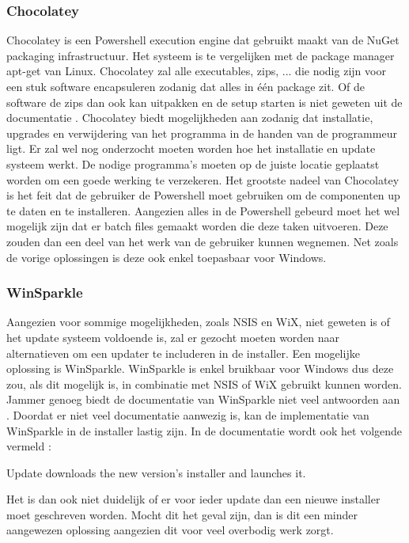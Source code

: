 \documentclass{article}
\begin{document}
\subsubsection{Chocolatey \citep{chocoMain}}
Chocolatey is een Powershell execution engine dat gebruikt maakt van de NuGet packaging infrastructuur.
Het systeem is te vergelijken met de package manager apt-get van Linux.
Chocolatey zal alle executables, zips, ... die nodig zijn voor een stuk software encapsuleren zodanig dat alles in \'e\'en package zit.
Of de software de zips dan ook kan uitpakken en de setup starten is niet geweten uit de documentatie \citep{chocoDoc}.
Chocolatey biedt mogelijkheden aan zodanig dat installatie, upgrades en verwijdering van het programma in de handen van de programmeur ligt.
Er zal wel nog onderzocht moeten worden hoe het installatie en update systeem werkt.
De nodige programma's moeten op de juiste locatie geplaatst worden om een goede werking te verzekeren.
Het grootste nadeel van Chocolatey is het feit dat de gebruiker de Powershell moet gebruiken om de componenten up te daten en te installeren.
Aangezien alles in de Powershell gebeurd moet het wel mogelijk zijn dat er batch files gemaakt worden die deze taken uitvoeren.
Deze zouden dan een deel van het werk van de gebruiker kunnen wegnemen.
Net zoals de vorige oplossingen is deze ook enkel toepasbaar voor Windows.

\subsubsection{WinSparkle \citep{winsparkleMain}}
Aangezien voor sommige mogelijkheden, zoals NSIS en WiX, niet geweten is of het update systeem voldoende is, zal er gezocht moeten worden naar alternatieven om een updater te includeren in de installer.
Een mogelijke oplossing is WinSparkle.
WinSparkle is enkel bruikbaar voor Windows dus deze zou, als dit mogelijk is, in combinatie met NSIS of WiX gebruikt kunnen worden.
Jammer genoeg biedt de documentatie van WinSparkle niet veel antwoorden aan  \citep{winsparkleDoc}.
Doordat er niet veel documentatie aanwezig is, kan de implementatie van WinSparkle in de installer lastig zijn.
In de documentatie wordt ook het volgende vermeld \citep{winsparkleDocUser}:

\begin{displayquote}
Update downloads the new version's installer and launches it.
\end{displayquote}

Het is dan ook niet duidelijk of er voor ieder update dan een nieuwe installer moet geschreven worden.
Mocht dit het geval zijn, dan is dit een minder aangewezen oplossing aangezien dit voor veel overbodig werk zorgt.
\end{document}
